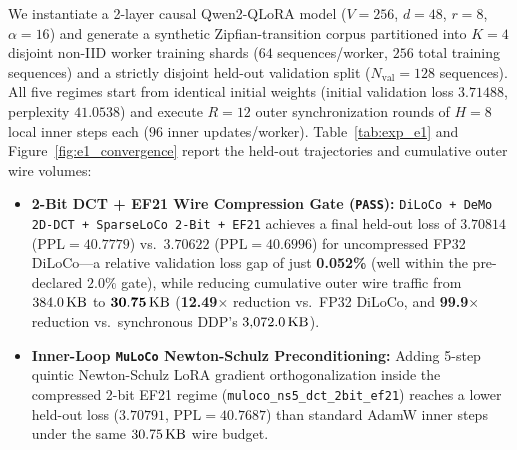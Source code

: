 \documentclass[11pt,a4paper]{article}
\begin{document}
We instantiate a 2-layer causal Qwen2-QLoRA model ($V=256$, $d=48$, $r=8$, $\alpha=16$) and generate a synthetic Zipfian-transition corpus partitioned into $K=4$ disjoint non-IID worker training shards ($64$ sequences/worker, $256$ total training sequences) and a strictly disjoint held-out validation split ($N_{\text{val}} = 128$ sequences). All five regimes start from identical initial weights (initial validation loss $3.71488$, perplexity $41.0538$) and execute $R=12$ outer synchronization rounds of $H=8$ local inner steps each ($96$ inner updates/worker). Table~\ref{tab:exp_e1} and Figure~\ref{fig:e1_convergence} report the held-out trajectories and cumulative outer wire volumes:
\begin{itemize}[leftmargin=1.8em]
    \item \textbf{2-Bit DCT + EF21 Wire Compression Gate (\texttt{PASS}):} \texttt{DiLoCo + DeMo 2D-DCT + SparseLoCo 2-Bit + EF21} achieves a final held-out loss of $\mathbf{3.70814}$ ($\text{PPL} = 40.7779$) vs.\ $\mathbf{3.70622}$ ($\text{PPL} = 40.6996$) for uncompressed FP32 DiLoCo---a relative validation loss gap of just \textbf{0.052\%} (well within the pre-declared $2.0\%$ gate), while reducing cumulative outer wire traffic from $384.0\text{\,KB}$ to $\mathbf{30.75\text{\,KB}}$ (\textbf{12.49$\times$} reduction vs.\ FP32 DiLoCo, and \textbf{99.9$\times$} reduction vs.\ synchronous DDP's $3{,}072.0\text{\,KB}$).
    \item \textbf{Inner-Loop \texttt{MuLoCo} Newton-Schulz Preconditioning:} Adding 5-step quintic Newton-Schulz LoRA gradient orthogonalization inside the compressed 2-bit EF21 regime (\texttt{muloco\_ns5\_dct\_2bit\_ef21}) reaches a lower held-out loss ($\mathbf{3.70791}$, $\text{PPL} = 40.7687$) than standard AdamW inner steps under the same $30.75\text{\,KB}$ wire budget.
\end{itemize}
\end{document}
